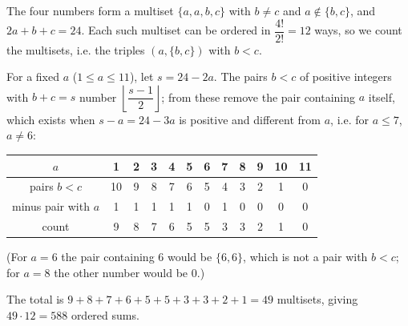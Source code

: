 The four numbers form a multiset $\{a,a,b,c\}$ with $b\ne c$ and $a\notin\{b,c\}$, and $2a+b+c=24$. Each such multiset can be ordered in $\dfrac{4!}{2!}=12$ ways, so we count the multisets, i.e. the triples $(a,\{b,c\})$ with $b<c$.

For a fixed $a$ ($1\le a\le11$), let $s=24-2a$. The pairs $b<c$ of positive integers with $b+c=s$ number $\left\lfloor\dfrac{s-1}{2}\right\rfloor$; from these remove the pair containing $a$ itself, which exists when $s-a=24-3a$ is positive and different from $a$, i.e. for $a\le7$, $a\ne6$:
\begin{center}
\begin{tabular}{c|ccccccccccc}
$a$ & 1&2&3&4&5&6&7&8&9&10&11\\ \hline
pairs $b<c$ & 10&9&8&7&6&5&4&3&2&1&0\\
minus pair with $a$ & 1&1&1&1&1&0&1&0&0&0&0\\ \hline
count & 9&8&7&6&5&5&3&3&2&1&0
\end{tabular}
\end{center}
(For $a=6$ the pair containing $6$ would be $\{6,6\}$, which is not a pair with $b<c$; for $a=8$ the other number would be $0$.)

The total is $9+8+7+6+5+5+3+3+2+1=49$ multisets, giving $49\cdot12=\boxed{588}$ ordered sums.
